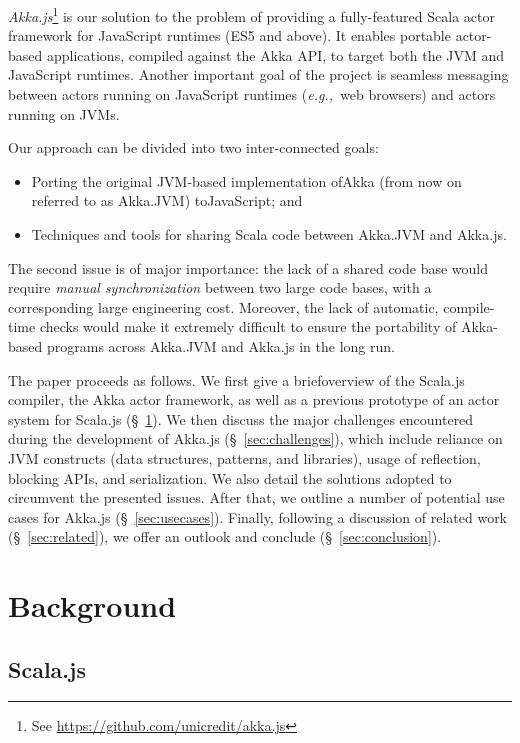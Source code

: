 \documentclass{sig-alternate}
\newcommand{\eg}{{\em e.g.,~}}
\begin{document}
{\em Akka.js}\footnote{See \url{https://github.com/unicredit/akka.js}} is our solution to the problem of providing a fully-featured Scala actor framework for JavaScript runtimes (ES5 and above). It enables portable actor-based applications, compiled against the Akka API, to target both the JVM and JavaScript runtimes. Another important goal of the project is seamless messaging between actors running on JavaScript runtimes (\eg web browsers) and actors running on JVMs.

Our approach can be divided into two inter-connected goals:
\begin{itemize}
	\item Porting the original JVM-based implementation of\newline Akka (from now on referred to as Akka.JVM) to\newline JavaScript; and
	\item Techniques and tools for sharing Scala code between Akka.JVM and Akka.js.
\end{itemize}
\noindent
The second issue is of major importance: the lack of a shared code base would require {\em manual synchronization} between two large code bases, with a corresponding large engineering cost. Moreover, the lack of automatic, compile-time checks would make it extremely difficult to ensure the portability of Akka-based programs across Akka.JVM and Akka.js in the long run.

The paper proceeds as follows. We first give a brief\newline overview of the Scala.js compiler, the Akka actor framework, as well as a previous prototype of an actor system for Scala.js (\S~\ref{sec:background}). We then discuss the major challenges encountered during the development of Akka.js (\S~\ref{sec:challenges}), which include reliance on JVM constructs (data structures, patterns, and libraries), usage of reflection, blocking APIs, and serialization. We also detail the solutions adopted to circumvent the presented issues. After that, we outline a number of potential use cases for Akka.js (\S~\ref{sec:usecases}). Finally, following a discussion of related work (\S~\ref{sec:related}), we offer an outlook and conclude (\S~\ref{sec:conclusion}).

\section{Background}\label{sec:background}

\subsection{Scala.js}
\end{document}

